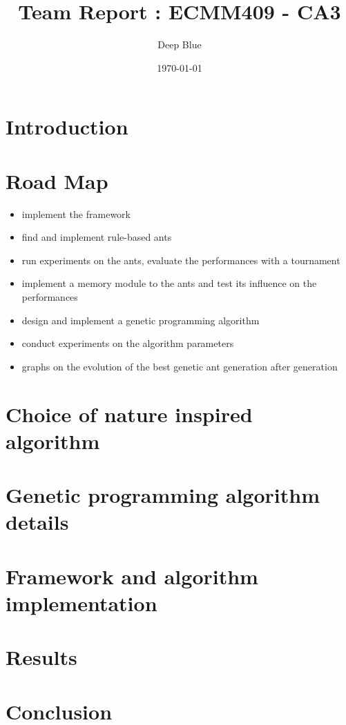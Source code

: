 \documentclass[10pt,a4paper]{article}
\begin{document}
\title{Team Report : ECMM409 - CA3}
\author {Deep Blue}
\date{\today}

\maketitle

\tableofcontents
\newpage

\section*{Introduction}



\section{Road Map}
\begin{itemize}
\item implement the framework 
\item find and implement rule-based ants
\item run experiments on the ants, evaluate the performances with a tournament
\item implement a memory module to the ants and test its influence on the performances
\item design and implement a genetic programming algorithm
\item conduct experiments on the algorithm parameters
\item graphs on the evolution of the best genetic ant generation after generation
\end{itemize}

\section{Choice of nature inspired algorithm}

\section{Genetic programming algorithm details}

\section{Framework and algorithm implementation}

\section{Results}

\section*{Conclusion}
\end{document}
